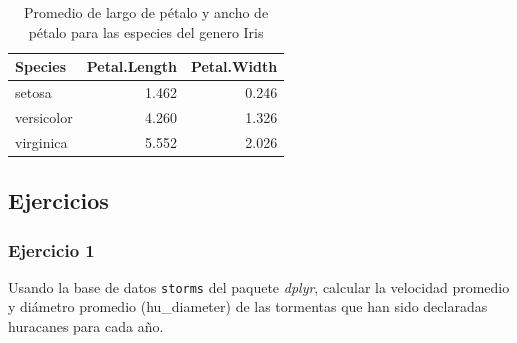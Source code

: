 \documentclass[]{book}
\newenvironment{Shaded}{\begin{snugshade}}{\end{snugshade}}
\newcommand{\KeywordTok}[1]{\textcolor[rgb]{0.13,0.29,0.53}{\textbf{#1}}}
\newcommand{\NormalTok}[1]{#1}
\newcommand{\OperatorTok}[1]{\textcolor[rgb]{0.81,0.36,0.00}{\textbf{#1}}}
\newcommand{\StringTok}[1]{\textcolor[rgb]{0.31,0.60,0.02}{#1}}
\begin{document}
\begin{Shaded}
\end{Shaded}

\begin{Shaded}
\end{Shaded}

\begin{table}

\caption{\label{tab:Selected}Promedio de largo de pétalo y ancho de pétalo para las especies del genero Iris}
\centering
\begin{tabular}[t]{lrr}
\toprule
Species & Petal.Length & Petal.Width\\
\midrule
setosa & 1.462 & 0.246\\
versicolor & 4.260 & 1.326\\
virginica & 5.552 & 2.026\\
\bottomrule
\end{tabular}
\end{table}

\hypertarget{ejercicios}{%
\subsection{Ejercicios}\label{ejercicios}}

\hypertarget{ejercicio-1}{%
\subsubsection{Ejercicio 1}\label{ejercicio-1}}

Usando la base de datos \texttt{storms} del paquete \emph{dplyr},
calcular la velocidad promedio y diámetro promedio (hu\_diameter) de las
tormentas que han sido declaradas huracanes para cada año.
\end{document}
